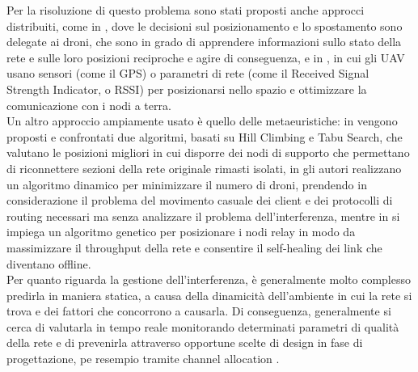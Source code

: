 Per la risoluzione di questo problema sono stati proposti anche approcci distribuiti, come in \cite{Correll09ad-hocwireless}, dove le decisioni sul posizionamento e lo spostamento sono delegate ai droni, che sono in grado di apprendere informazioni sullo stato della rete e sulle loro posizioni reciproche e agire di conseguenza, e in \cite{6162393}, in cui gli UAV usano sensori (come il GPS) o parametri di rete (come il Received Signal Strength Indicator, o RSSI) per posizionarsi nello spazio e ottimizzare la comunicazione con i nodi a terra. \\
Un altro approccio ampiamente usato è quello delle metaeuristiche: in \cite{5983050} vengono proposti e confrontati due algoritmi, basati su Hill Climbing e Tabu Search, che valutano le posizioni migliori in cui disporre dei nodi di supporto che permettano di riconnettere sezioni della rete originale rimasti isolati, in \cite{1495151} gli autori realizzano un algoritmo dinamico per minimizzare il numero di droni, prendendo in considerazione il problema del movimento casuale dei client e dei protocolli di routing necessari ma senza analizzare il problema dell'interferenza, mentre in \cite{Rohde20131893} si impiega un algoritmo genetico per posizionare i nodi relay in modo da massimizzare il throughput della rete e consentire il self-healing dei link che diventano offline. \\     
Per quanto riguarda la gestione dell'interferenza, è generalmente molto complesso predirla in maniera statica, a causa della dinamicità dell'ambiente in cui la rete si trova e dei fattori che concorrono a causarla. Di  conseguenza, generalmente si cerca di valutarla in tempo reale monitorando determinati parametri di qualità della rete \cite{Halperin:2010:PPD:1851275.1851203,6151307} e di prevenirla attraverso opportune scelte di design in fase di progettazione, pe resempio tramite channel allocation \cite{7383864}. \\

